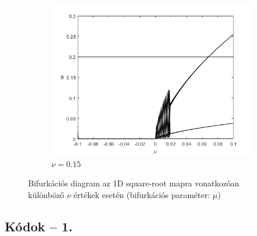 \begin{figure}[ht!]
     \begin{subfigure}[b]{0.45\linewidth}
         \centering
         \includegraphics[width=1\linewidth]{graphics/bif_015.png}
         \caption{$\nu=0.15$}
         \label{fig:nagy_csillapitas}
     \end{subfigure}
     \caption{Bifurkációs diagram az 1D square-root mapra vonatkozóan különböző $\nu$ értékek esetén (bifurkációs paraméter: $\mu$)}\label{fig:bif}
\end{figure}

\newpage
\subsection{Kódok -- 1.}\label{ap:codes1}

